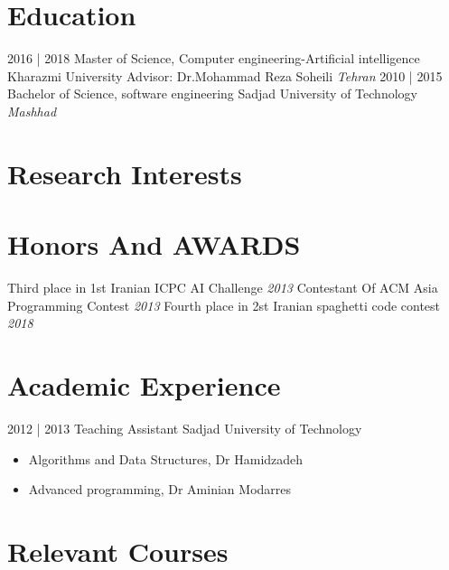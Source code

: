 \documentclass[letterpaper]{moderncv}        %
\begin{document}
\makecvtitle
    

\section{Education}

\cventry
{2016 | 2018}
{Master of Science, Computer engineering-Artificial intelligence}
{Kharazmi University}
{Advisor: Dr.Mohammad Reza Soheili}
{\textit{Tehran}}
{}
\cventry
{2010 | 2015}
{Bachelor of Science, software engineering}
{Sadjad University of Technology}
{}
{\textit{Mashhad}}
{}
\section{Research Interests}



\section{Honors And AWARDS}
\cventry
{}
{Third place in 1st Iranian ICPC AI Challenge}
{}
{\textit{2013}}
{}
{}
\vspace{1mm}
\cventry
{}
{Contestant Of ACM Asia Programming Contest}
{}
{\textit{2013}}
{}
{}
\vspace{1mm}
\cventry
{}
{Fourth place in 2st Iranian spaghetti code contest}
{}
{\textit{2018}}
{}
{}
\vspace{1mm}
\section{Academic Experience}
\cventry
{2012 | 2013}
{Teaching Assistant}
{Sadjad University of Technology}
{}
{}
{\begin{itemize}%
	\item Algorithms and Data Structures, Dr Hamidzadeh
	\item Advanced programming, Dr Aminian Modarres 
	\end{itemize}}
	
\section{Relevant Courses}

\end{document}

